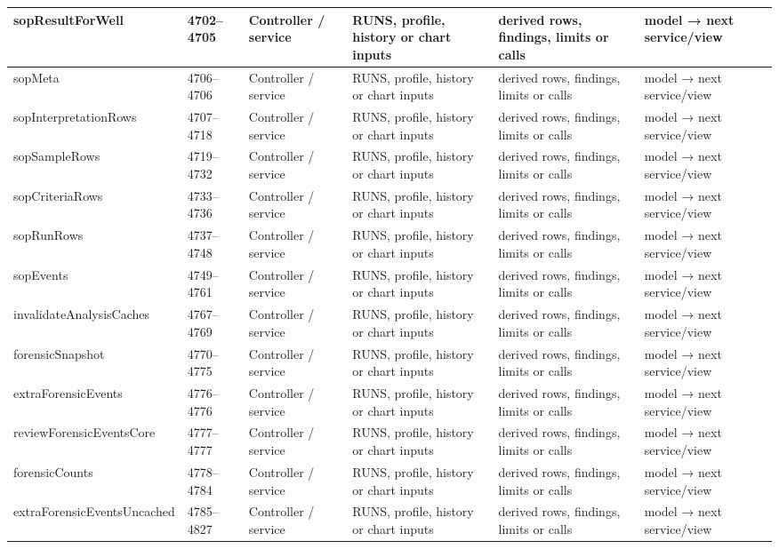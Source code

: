 \begin{landscape}
\begin{longtable}{@{}p{3.2cm}p{1.45cm}p{2.7cm}p{4.0cm}p{4.0cm}p{3.0cm}@{}}
sopResultForWell & 4702--4705 & Controller / service & RUNS, profile, history or chart inputs & derived rows, findings, limits or calls & model → next service/view \\\hline
sopMeta & 4706--4706 & Controller / service & RUNS, profile, history or chart inputs & derived rows, findings, limits or calls & model → next service/view \\\hline
sopInterpretationRows & 4707--4718 & Controller / service & RUNS, profile, history or chart inputs & derived rows, findings, limits or calls & model → next service/view \\\hline
sopSampleRows & 4719--4732 & Controller / service & RUNS, profile, history or chart inputs & derived rows, findings, limits or calls & model → next service/view \\\hline
sopCriteriaRows & 4733--4736 & Controller / service & RUNS, profile, history or chart inputs & derived rows, findings, limits or calls & model → next service/view \\\hline
sopRunRows & 4737--4748 & Controller / service & RUNS, profile, history or chart inputs & derived rows, findings, limits or calls & model → next service/view \\\hline
sopEvents & 4749--4761 & Controller / service & RUNS, profile, history or chart inputs & derived rows, findings, limits or calls & model → next service/view \\\hline
invalidateAnalysisCaches & 4767--4769 & Controller / service & RUNS, profile, history or chart inputs & derived rows, findings, limits or calls & model → next service/view \\\hline
forensicSnapshot & 4770--4775 & Controller / service & RUNS, profile, history or chart inputs & derived rows, findings, limits or calls & model → next service/view \\\hline
extraForensicEvents & 4776--4776 & Controller / service & RUNS, profile, history or chart inputs & derived rows, findings, limits or calls & model → next service/view \\\hline
reviewForensicEventsCore & 4777--4777 & Controller / service & RUNS, profile, history or chart inputs & derived rows, findings, limits or calls & model → next service/view \\\hline
forensicCounts & 4778--4784 & Controller / service & RUNS, profile, history or chart inputs & derived rows, findings, limits or calls & model → next service/view \\\hline
extraForensicEventsUncached & 4785--4827 & Controller / service & RUNS, profile, history or chart inputs & derived rows, findings, limits or calls & model → next service/view \\\hline

\end{longtable}
\end{landscape}
